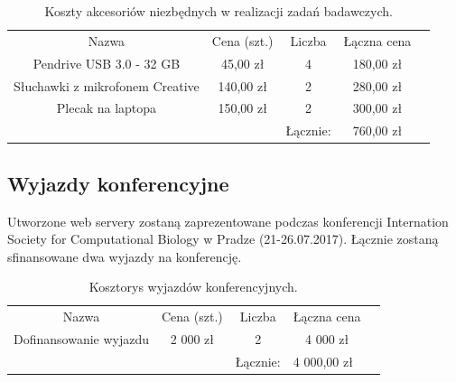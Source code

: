 \documentclass{article}
\begin{document}
\begin{table}[]
\centering
\caption{Koszty akcesoriów niezbędnych w realizacji zadań badawczych.}
\label{tab:akcesoria}
\begin{tabular}{ccccc}
\cline{1-4}
\multicolumn{1}{|c|}{Nazwa}                           & \multicolumn{1}{c|}{Cena 
(szt.)} & \multicolumn{1}{c|}{Liczba} & \multicolumn{1}{c|}{Łączna cena} &       
               \\ \cline{1-4}
\multicolumn{1}{|c|}{Pendrive USB 3.0 - 32 GB}        & 
\multicolumn{1}{c|}{45,00 zł}    & \multicolumn{1}{c|}{4}      & 
\multicolumn{1}{c|}{180,00 zł}   &                      \\ \cline{1-4}
\multicolumn{1}{|c|}{Słuchawki z mikrofonem Creative} & 
\multicolumn{1}{c|}{140,00 zł}   & \multicolumn{1}{c|}{2}      & 
\multicolumn{1}{c|}{280,00 zł}   &                      \\ \cline{1-4}
\multicolumn{1}{|c|}{Plecak na laptopa}               & 
\multicolumn{1}{c|}{150,00 zł}   & \multicolumn{1}{c|}{2}      & 
\multicolumn{1}{c|}{300,00 zł}   & \multicolumn{1}{l}{} \\ \cline{1-4}
                                                      &                          
        & Łącznie:                    & 760,00 zł                        &       
              
\end{tabular}
\end{table}

\subsection{Wyjazdy konferencyjne}

Utworzone web servery zostaną zaprezentowane podczas konferencji Internation 
Society for Computational Biology w Pradze (21-26.07.2017). Łącznie zostaną 
sfinansowane dwa wyjazdy na konferencję.

\begin{table}[!htbp]
\centering
\caption{Kosztorys wyjazdów konferencyjnych.}
\begin{tabular}{lllll}
\cline{1-4}
\multicolumn{1}{|c|}{Nazwa}                     & \multicolumn{1}{c|}{Cena (szt.)} & \multicolumn{1}{c|}{Liczba} & \multicolumn{1}{c|}{Łączna cena} &  \\ \cline{1-4}
\multicolumn{1}{|c|}{Dofinansowanie wyjazdu} & \multicolumn{1}{c|}{2 000 zł}    
 & \multicolumn{1}{c|}{2}      & \multicolumn{1}{c|}{4 000 zł}     &  \\ 
\cline{1-4}
                                                &                                
  & Łącznie:                    & 4 000,00 zł                          & 
\end{tabular}
\end{table}


 

\end{document}
